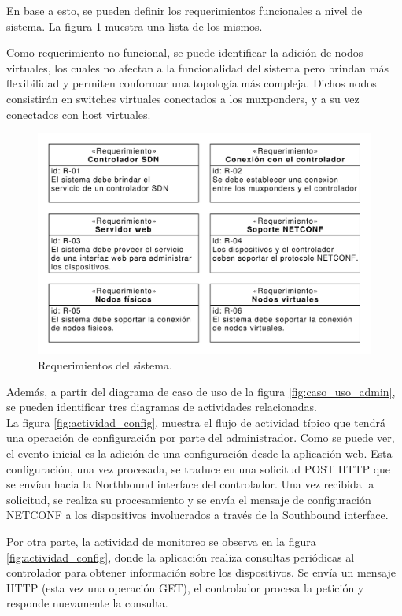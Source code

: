   En base a esto, se pueden definir los requerimientos funcionales a nivel de sistema. La figura \ref{fig:req_sys} muestra una lista de los mismos. 
  
  Como requerimiento no funcional, se puede identificar la adición de nodos virtuales, los cuales no afectan a la funcionalidad del sistema pero brindan más flexibilidad y permiten conformar una topología más compleja. Dichos nodos consistirán en switches virtuales conectados a los muxponders, y a su vez conectados con host virtuales.

  \begin{figure}[H]
    \centering
    \includegraphics[scale=0.65]{Figures/req_sys.pdf}
    \caption{Requerimientos del sistema.}
    \label{fig:req_sys}
  \end{figure}


  Además, a partir del diagrama de caso de uso de la figura \ref{fig:caso_uso_admin}, se pueden identificar tres diagramas de actividades relacionadas. 
  \\

La figura \ref{fig:actividad_config}, muestra el flujo de actividad típico que tendrá una operación de configuración por parte del administrador. Como se puede ver, el evento inicial es la adición de una configuración desde la aplicación web. Esta configuración, una vez procesada, se traduce en una solicitud POST HTTP que se envían hacia la Northbound interface del controlador. Una vez recibida la solicitud, se realiza su procesamiento y se envía el mensaje de configuración NETCONF a los dispositivos involucrados a través de la Southbound interface.

  Por otra parte, la actividad de monitoreo se observa en la figura \ref{fig:actividad_config}, donde la aplicación realiza consultas periódicas al controlador para obtener información sobre los dispositivos. Se envía un mensaje HTTP (esta vez una operación GET), el controlador procesa la petición y responde nuevamente la consulta.

